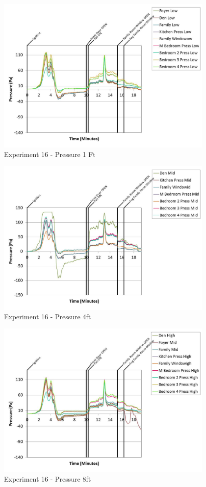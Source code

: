 \documentclass{article}
\begin{document}
\begin{appendices}
	\begin{figure}[h!]
		\centering
		\includegraphics[height=3.05in]{0_Images/Results_Charts/Exp_16_Charts/Pressure1Ft.pdf}
		\caption{Experiment 16 - Pressure 1 Ft}
	\end{figure}
 
	\clearpage

	\begin{figure}[h!]
		\centering
		\includegraphics[height=3.05in]{0_Images/Results_Charts/Exp_16_Charts/Pressure4ft.pdf}
		\caption{Experiment 16 - Pressure 4ft}
	\end{figure}
 

	\begin{figure}[h!]
		\centering
		\includegraphics[height=3.05in]{0_Images/Results_Charts/Exp_16_Charts/Pressure8ft.pdf}
		\caption{Experiment 16 - Pressure 8ft}
	\end{figure}
 

\end{appendices}
\end{document}
